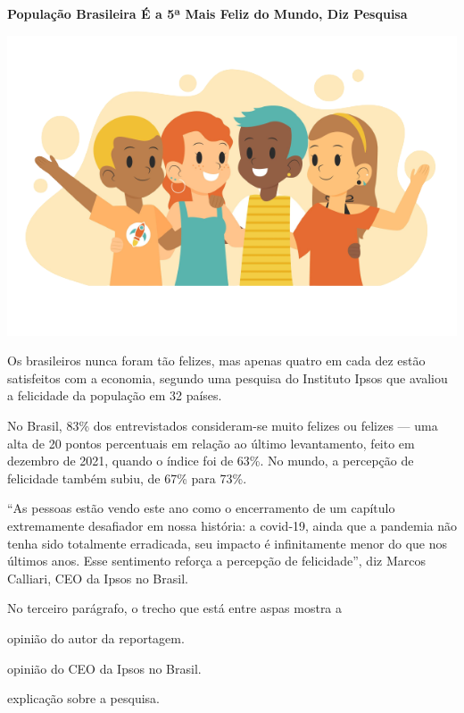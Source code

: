 \begin{conteudo}
\begin{conteudo}
\begin{conteudo}
\begin{conteudo}
\begin{conteudo}
\begin{myquote}
\textbf{População Brasileira É a 5ª Mais Feliz do Mundo, Diz Pesquisa}

\begin{center}
\includegraphics[width=.6\textwidth]{media/image28c.png}
\end{center}

Os brasileiros nunca foram tão felizes, mas apenas quatro em cada dez
estão satisfeitos com a economia, segundo uma pesquisa do Instituto
Ipsos que avaliou a felicidade da população em 32 países.

No Brasil, 83\% dos entrevistados consideram-se muito felizes ou felizes
--- uma alta de 20 pontos percentuais em relação ao último levantamento,
feito em dezembro de 2021, quando o índice foi de 63\%. No mundo, a
percepção de felicidade também subiu, de 67\% para 73\%.

``As pessoas estão vendo este ano como o encerramento de um capítulo
extremamente desafiador em nossa história: a covid-19, ainda que a
pandemia não tenha sido totalmente erradicada, seu impacto é
infinitamente menor do que nos últimos anos. Esse sentimento reforça a
percepção de felicidade'', diz Marcos Calliari, CEO da Ipsos no Brasil.

\end{myquote}

No terceiro parágrafo, o trecho que está entre aspas mostra a

\begin{escolha}
\item opinião do autor da reportagem.

\item opinião do CEO da Ipsos no Brasil.

\item explicação sobre a pesquisa.


\end{escolha}
\end{conteudo}
\end{conteudo}
\end{conteudo}
\end{conteudo}
\end{conteudo}
